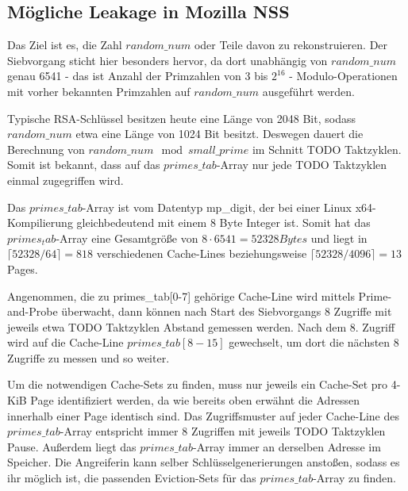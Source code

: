 \subsection{Mögliche Leakage in Mozilla NSS} 
\label{leakageMozillaNSS}

Das Ziel ist es, die Zahl $random\_num$ oder Teile davon zu rekonstruieren.
Der Siebvorgang sticht hier besonders hervor, da dort unabhängig von $random\_num$ genau 6541 - das ist Anzahl der Primzahlen von 3 bis $2^{16}$ - Modulo-Operationen mit vorher bekannten Primzahlen auf $random\_num$ ausgeführt werden.

Typische RSA-Schlüssel besitzen heute eine Länge von 2048 Bit, sodass $random\_num$ etwa eine Länge von 1024 Bit besitzt.
Deswegen dauert die Berechnung von $random\_num \mod small\_prime$ im Schnitt TODO Taktzyklen.
Somit ist bekannt, dass auf das $primes\_tab$-Array nur jede TODO Taktzyklen einmal zugegriffen wird.

Das $primes\_tab$-Array ist vom Datentyp mp_digit, der bei einer Linux x64-Kompilierung gleichbedeutend mit einem 8 Byte Integer ist.
Somit hat das $primes_tab$-Array eine Gesamtgröße von $8 \cdot 6541 = 52328 Bytes$ und liegt in $\lceil 52328 / 64 \rceil = 818$ verschiedenen Cache-Lines beziehungsweise $\lceil 52328 / 4096 \rceil = 13$ Pages.

Angenommen, die zu primes_tab[0-7] gehörige Cache-Line wird mittels Prime-and-Probe überwacht, dann können nach Start des Siebvorgangs 8 Zugriffe mit jeweils etwa TODO Taktzyklen Abstand gemessen werden.
Nach dem 8. Zugriff wird auf die Cache-Line $primes\_tab[8-15]$ gewechselt, um dort die nächsten 8 Zugriffe zu messen und so weiter.

Um die notwendigen Cache-Sets zu finden, muss nur jeweils ein Cache-Set pro 4-KiB Page identifiziert werden, da wie bereits oben erwähnt die Adressen innerhalb einer Page identisch sind.
Das Zugriffsmuster auf jeder Cache-Line des $primes\_tab$-Array entspricht immer 8 Zugriffen mit jeweils TODO Taktzyklen Pause. Außerdem liegt das $primes\_tab$-Array immer an derselben Adresse im Speicher.
Die Angreiferin kann selber Schlüsselgenerierungen anstoßen, sodass es ihr möglich ist, die passenden Eviction-Sets für das $primes\_tab$-Array zu finden.

